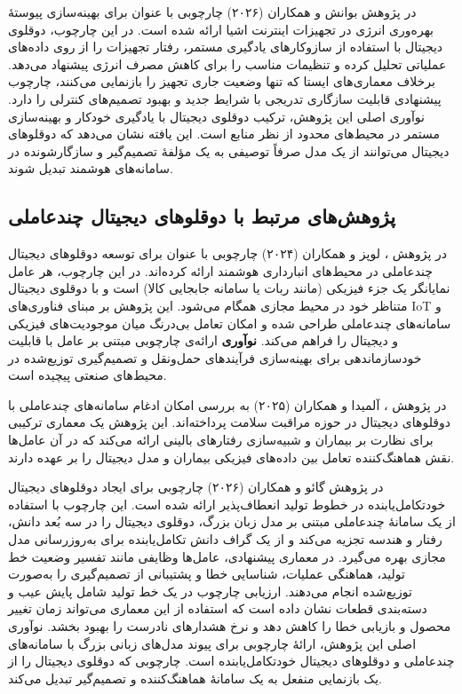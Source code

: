 \documentclass[a4paper,fleqn]{report}
\begin{document}
در پژوهش
بوانش و همکاران (۲۰۲۶)
\cite{bhuvanesh2026selflearningdt}
چارچوبی با عنوان
برای بهینه‌سازی پیوستهٔ بهره‌وری انرژی در تجهیزات اینترنت اشیا ارائه شده است. در این چارچوب، دوقلوی دیجیتال با استفاده از سازوکارهای یادگیری مستمر، رفتار تجهیزات را از روی داده‌های عملیاتی تحلیل کرده و تنظیمات مناسب را برای کاهش مصرف انرژی پیشنهاد می‌دهد. برخلاف معماری‌های ایستا که تنها وضعیت جاری تجهیز را بازنمایی می‌کنند، چارچوب پیشنهادی قابلیت سازگاری تدریجی با شرایط جدید و بهبود تصمیم‌های کنترلی را دارد. نوآوری اصلی این پژوهش، ترکیب دوقلوی دیجیتال با یادگیری خودکار و بهینه‌سازی مستمر در محیط‌های محدود از نظر منابع است. این یافته نشان می‌دهد که دوقلوهای دیجیتال می‌توانند از یک مدل صرفاً توصیفی به یک مؤلفهٔ تصمیم‌گیر و سازگارشونده در سامانه‌های هوشمند تبدیل شوند.



\subsection{پژوهش‌های مرتبط با دوقلوهای دیجیتال چندعاملی}

در پژوهش \cite{lopez2024madtwin}، 
لوپز و همکاران (۲۰۲۴)
چارچوبی با عنوان  برای توسعه دوقلوهای دیجیتال چندعاملی در محیط‌های انبارداری هوشمند ارائه کرده‌اند. در این چارچوب، هر عامل نمایانگر یک جزء فیزیکی (مانند ربات یا سامانه جابجایی کالا) است و با دوقلوی دیجیتال متناظر خود در محیط مجازی همگام می‌شود. این پژوهش بر مبنای فناوری‌های 
 \gls{IoT}
  و سامانه‌های چندعاملی طراحی شده و امکان تعامل بی‌درنگ میان موجودیت‌های فیزیکی و دیجیتال را فراهم می‌کند. \textbf{نوآوری} ارائه‌ی چارچوبی مبتنی بر عامل با قابلیت خودسازماندهی برای بهینه‌سازی فرآیندهای حمل‌ونقل و تصمیم‌گیری توزیع‌شده در محیط‌های صنعتی پیچیده است.

در پژوهش \cite{almeida2025healthagentsdt}، 
آلمیدا و همکاران (۲۰۲۵)
 به بررسی امکان ادغام سامانه‌های چندعاملی با دوقلوهای دیجیتال در حوزه مراقبت سلامت پرداخته‌اند. این پژوهش یک معماری ترکیبی برای نظارت بر بیماران و شبیه‌سازی رفتارهای بالینی ارائه می‌کند که در آن عامل‌ها نقش هماهنگ‌کننده تعامل بین داده‌های فیزیکی بیماران و مدل دیجیتال را بر عهده دارند. 


در پژوهش
گائو و همکاران (۲۰۲۶)
\cite{gao2026selfevolving}
چارچوبی برای ایجاد دوقلوهای دیجیتال خودتکامل‌یابنده در خطوط تولید انعطاف‌پذیر ارائه شده است. این چارچوب با استفاده از یک سامانهٔ چندعاملی مبتنی بر مدل زبان بزرگ، دوقلوی دیجیتال را در سه بُعد دانش، رفتار و هندسه تجزیه می‌کند و از یک گراف دانش تکامل‌یابنده برای به‌روزرسانی مدل مجازی بهره می‌گیرد. در معماری پیشنهادی، عامل‌ها وظایفی مانند تفسیر وضعیت خط تولید، هماهنگی عملیات، شناسایی خطا و پشتیبانی از تصمیم‌گیری را به‌صورت توزیع‌شده انجام می‌دهند. ارزیابی چارچوب در یک خط تولید شامل پایش عیب و دسته‌بندی قطعات نشان داده است که استفاده از این معماری می‌تواند زمان تغییر محصول و بازیابی خطا را کاهش دهد و نرخ هشدارهای نادرست را بهبود بخشد. نوآوری اصلی این پژوهش، ارائهٔ چارچوبی برای پیوند مدل‌های زبانی بزرگ با سامانه‌های چندعاملی و دوقلوهای دیجیتال خودتکامل‌یابنده است. چارچوبی که دوقلوی دیجیتال را از یک بازنمایی منفعل به یک سامانهٔ هماهنگ‌کننده و تصمیم‌گیر تبدیل می‌کند.
\end{document}
